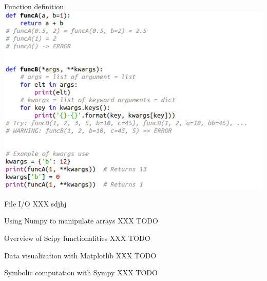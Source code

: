 \documentclass[11pt,unknownkeysallowed,usenames,dvipsnames]{beamer}
\begin{document}
%    
\begin{frame}{Function definition}
    \includegraphics[width=0.9\linewidth]{code-func}
    
\end{frame}
   

\begin{frame}{File I/O}
	XXX sdjhj
\end{frame}


\begin{frame}{Using Numpy to manipulate arrays}
	XXX TODO
\end{frame}


\begin{frame}{Overview of Scipy functionalities}
    XXX TODO
\end{frame}


\begin{frame}{Data visualization with Matplotlib}
    XXX TODO
\end{frame}


\begin{frame}{Symbolic computation with Sympy}
    XXX TODO
\end{frame}
\end{document}
